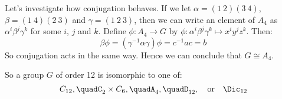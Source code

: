 \begin{enumerate}
        Let's investigate how conjugation behaves.
        If we let \(\alpha = (1\ 2)(3\ 4)\), \(\beta = (1\ 4)(2\ 3)\) and \(\gamma = (1\ 2\ 3)\), then we can write an
        element of \(A_4\) as \(\alpha^i\beta^j\gamma^k\) for some \(i\), \(j\) and \(k\).
        Define \(\phi:A_4 \to G\) by \(\phi:\alpha^i\beta^j\gamma^k \mapsto x^{i}y^{j}z^{k}\).
        Then:
        \[\beta\phi = (\gamma^{-1}\alpha\gamma)\phi = c^{-1}ac = b\]
        So conjugation acts in the same way.
        Hence we can conclude that \(G \cong A_4\).
\end{enumerate}


So a group \(G\) of order 12 is isomorphic to one of:
\[
    C_{12}, \quad%
    C_2 \times C_6, \quad%
    A_4, \quad%
    D_{12}, \quad \text{or} \quad%
    \Dic_{12}
\]

